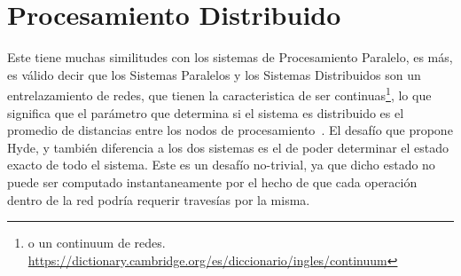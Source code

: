\section{Procesamiento Distribuido}
\label{sec:procesamiento_distribuido}

Este tiene muchas similitudes con los sistemas de Procesamiento Paralelo, es
más, es válido decir que los Sistemas Paralelos y los Sistemas Distribuidos son
un entrelazamiento de redes, que tienen la caracteristica de ser
continuas\footnote{
o un \gls{continuum} de redes.
\url{https://dictionary.cambridge.org/es/diccionario/ingles/continuum}}, lo que
significa que el parámetro que determina si el sistema es distribuido es el promedio de
distancias entre los nodos de procesamiento~\cite{hyde98}. El desafío que
propone Hyde, y también diferencia a los dos sistemas es el de poder determinar el
estado exacto de todo el sistema. Este es un desafío no-trivial, ya que dicho
estado no puede ser computado
instantaneamente por el hecho de que cada operación dentro de la red podría
requerir travesías por la misma.
